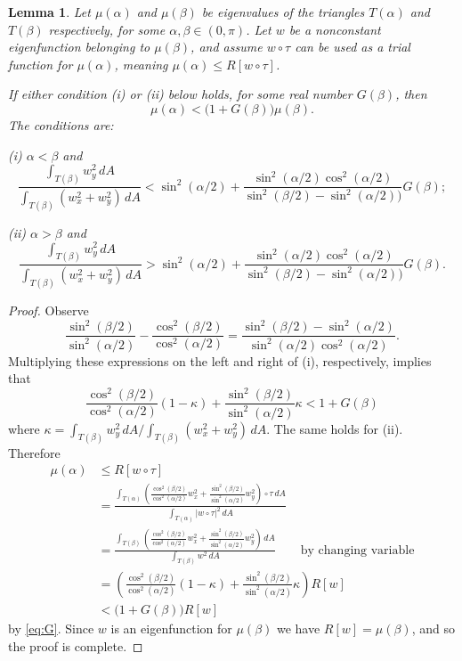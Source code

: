 \documentclass[11pt,reqno]{amsart}
\newtheorem{lemma}[theorem]{Lemma}
\numberwithin{equation}{section}
\begin{document}
\begin{lemma}\label{lemcomp}
Let $\mu(\alpha)$ and $\mu(\beta)$ be eigenvalues of the triangles $T(\alpha)$ and $T(\beta)$ respectively, for some $\alpha, \beta \in (0,\pi)$. Let $w$ be a nonconstant eigenfunction belonging to $\mu(\beta)$, and assume $w\circ\tau$  can be used as a trial function for $\mu(\alpha)$, meaning $\mu(\alpha) \leq R[w \circ \tau]$.

If either condition (i) or (ii) below holds, for some real number $G(\beta)$, then
\[
     \mu(\alpha) < \big( 1+G(\beta) \big) \mu(\beta) .
\]
The conditions are:

(i) $\alpha<\beta$ and
\[
    \frac{\int_{T(\beta)} w_y^2 \, dA}{\int_{T(\beta)} (w_x^2+w_y^2) \, dA}
    < \sin^2(\alpha/2)+\frac{\sin^2(\alpha/2)\cos^2(\alpha/2)}{\sin^2(\beta/2)-\sin^2(\alpha/2))}G(\beta) ;
\]

(ii) $\alpha>\beta$ and
\[
    \frac{\int_{T(\beta)} w_y^2 \, dA}{\int_{T(\beta)} (w_x^2+w_y^2) \, dA}
    > \sin^2(\alpha/2)+\frac{\sin^2(\alpha/2)\cos^2(\alpha/2)}{\sin^2(\beta/2)-\sin^2(\alpha/2))}G(\beta) .
\]
\end{lemma}

\begin{proof}
Observe
\[
\frac{\sin^2(\beta/2)}{\sin^2(\alpha/2)} - \frac{\cos^2(\beta/2)}{\cos^2(\alpha/2)} = \frac{\sin^2(\beta/2) - \sin^2(\alpha/2)}{\sin^2(\alpha/2) \cos^2(\alpha/2)} .
\]
Multiplying these expressions on the left and right of (i), respectively, implies that
\begin{equation} \label{eq:G}
\frac{\cos^2(\beta/2)}{\cos^2(\alpha/2)} (1-\kappa ) + \frac{\sin^2(\beta/2)}{\sin^2(\alpha/2)} \kappa < 1+G(\beta)
\end{equation}
where $\kappa = \int_{T(\beta)} w_y^2 \, dA \Big/ \int_{T(\beta)} (w_x^2+w_y^2) \, dA$. The same holds for (ii). Therefore
\begin{align*}
\mu(\alpha) & \leq R[w \circ \tau] \\
& = \frac{\int_{T(\alpha)}\left(\frac{\cos^2(\beta/2)}{\cos^2(\alpha/2)}w_x^2+\frac{\sin^2(\beta/2)}{\sin^2(\alpha/2)}w_y^2\right)\circ \tau \, dA}{\int_{T(\alpha)}|w\circ \tau|^2 \, dA} \\
& = \frac{\int_{T(\beta)} \left(\frac{\cos^2(\beta/2)}{\cos^2(\alpha/2)}w_x^2+\frac{\sin^2(\beta/2)}{\sin^2(\alpha/2)}w_y^2\right) \, dA}{\int_{T(\beta)} w^2 \, dA} \qquad \text{by changing variable} \\
& = \left( \frac{\cos^2(\beta/2)}{\cos^2(\alpha/2)} (1-\kappa) + \frac{\sin^2(\beta/2)}{\sin^2(\alpha/2)} \kappa \right) R[w] \\
& < \big( 1+G(\beta) \big) R[w] \label{mucomp}
\end{align*}
by \eqref{eq:G}. Since $w$ is an eigenfunction for $\mu(\beta)$ we have $R[w]=\mu(\beta)$, and so the proof is complete.
\end{proof}
\end{document}
